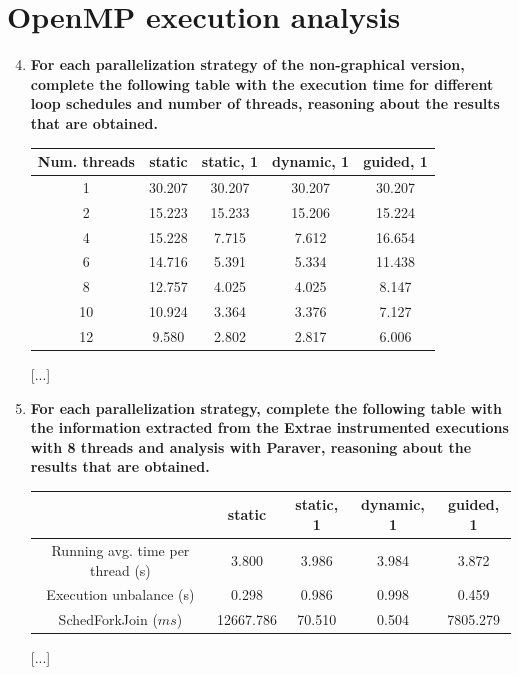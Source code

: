 \documentclass[a4paper,11pt]{article}
\begin{document}
\section{OpenMP execution analysis}
\begin{enumerate}
\setcounter{enumi}{3}
\item
\textbf{For each parallelization strategy of the non-graphical version, complete the following table with
    the execution time for different loop schedules and number of threads, reasoning about the results
    that are obtained.}
\begin{center}
\begin{tabular}{| c || c | c | c | c |}
\hline
\textbf{Num. threads} & \textbf{static} & \textbf{static, 1} & \textbf{dynamic, 1} & \textbf{guided, 1}
\\
\hline
\hline
1 & 30.207 & 30.207 & 30.207 & 30.207
\\
\hline
2 & 15.223 & 15.233 & 15.206 & 15.224
\\
\hline
4 & 15.228 & 7.715 & 7.612 & 16.654
\\
\hline
6 & 14.716 & 5.391 & 5.334 & 11.438
\\
\hline
8 & 12.757 & 4.025 & 4.025 & 8.147
\\
\hline
10 & 10.924 & 3.364 & 3.376 & 7.127
\\
\hline
12 & 9.580 & 2.802 & 2.817 & 6.006
\\
\hline
\end{tabular}
\end{center}
[...]
\setcounter{enumi}{4}
\item
\textbf{For each parallelization strategy, complete the following table with the information extracted from
    the Extrae instrumented executions with 8 threads and analysis with Paraver, reasoning about the
    results that are obtained.}
\begin{center}
\begin{tabular}{| c || c | c | c | c |}
\hline
\textbf{} & \textbf{static} & \textbf{static, 1} & \textbf{dynamic, 1} & \textbf{guided, 1}
\\
\hline
\hline
Running avg. time per thread (s) & 3.800 & 3.986 & 3.984 & 3.872
\\
\hline
Execution unbalance (s) & 0.298 & 0.986 & 0.998 & 0.459
\\
\hline
SchedForkJoin ($ms$) & 12667.786 & 70.510 & 0.504 & 7805.279
\\
\hline
\end{tabular}
\end{center}
[...]
\end{enumerate}
\end{document}
